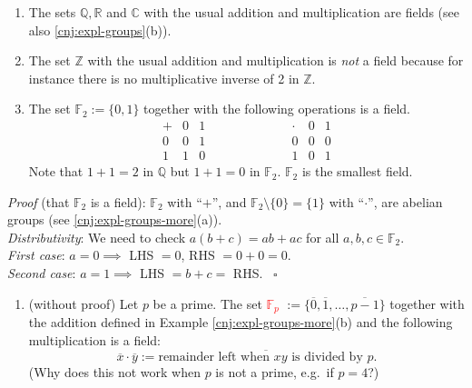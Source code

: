 \documentclass[
  12pt,
  a4paper,
  twoside]{article}
\providecommand{\tightlist}{%
  \setlength{\itemsep}{0pt}\setlength{\parskip}{0pt}}
\theoremstyle{plain}
\theoremstyle{definition}
\begin{document}
\begin{enumerate}
\def\labelenumi{(\alph{enumi})}
\item
  The sets \(\mathbb{Q}, \mathbb{R}\) and \(\mathbb{C}\) with the usual addition and multiplication are fields (see also \ref{cnj:expl-groups}(b)).
\item
  The set \(\mathbb{Z}\) with the usual addition and multiplication is \emph{not} a field because for instance there is no multiplicative inverse of 2 in \(\mathbb{Z}\).
\item
  The set \(\mathbb{F}_{2} := \{ 0, 1 \}\) together with the following operations is a field.
  \[
  \begin{array}{c|cc}
  {+} & 0 & 1 \\ \hline 0 & 0 & 1 \\ 1 & 1 & 0
  \end{array}
  \qquad \qquad \qquad
  \begin{array}{c|cc}
  \cdot & 0 & 1 \\ \hline 0 & 0 & 0 \\ 1 & 0 & 1
  \end{array}
  \]
  Note that \(1 + 1 = 2\) in \(\mathbb{Q}\) but \(1 + 1 =0\) in \(\mathbb{F}_{2}\). \(\mathbb{F}_{2}\) is the smallest field.
\end{enumerate}

\emph{Proof} (that \(\mathbb{F}_2\) is a field):
\(\mathbb{F}_{2}\) with ``\(+\)'', and \(\mathbb{F}_{2} \setminus \{ 0 \} = \{1\}\) with ``\(\cdot\)'', are abelian groups (see \ref{cnj:expl-groups-more}(a)).\\
\hspace*{0.333em}\hspace*{0.333em}\emph{Distributivity}: We need to check \(a(b+c) = ab + ac\) for all \(a, b, c \in \mathbb{F}_{2}\).\\
\hspace*{0.333em}\hspace*{0.333em}\hspace*{0.333em}\hspace*{0.333em}\emph{First case}: \(a=0 \implies\) LHS \(=0\), RHS \(= 0+0 =0\).\\
\hspace*{0.333em}\hspace*{0.333em}\hspace*{0.333em}\hspace*{0.333em}\emph{Second case}: \(a=1 \implies\) LHS \(= b+c =\) RHS. \hfill~{\(\square\)}

\begin{enumerate}
\def\labelenumi{(\alph{enumi})}
\setcounter{enumi}{3}
\tightlist
\item
  (without proof) Let \(p\) be a prime. The set \textcolor{red}{$\mathbb{F}_p$} \(:= \{ \overline{0}, \overline{1}, \dots , \overline{p-1} \}\) together with the addition defined in Example \ref{cnj:expl-groups-more}(b) and the following multiplication is a field:
  \[
  \overline{x} \cdot \overline{y} := \overline{\text{remainder left when $xy$ is divided by $p$}}.
  \]
  (Why does this not work when \(p\) is not a prime, e.g.~if \(p=4\)?)
\end{enumerate}
\end{document}
